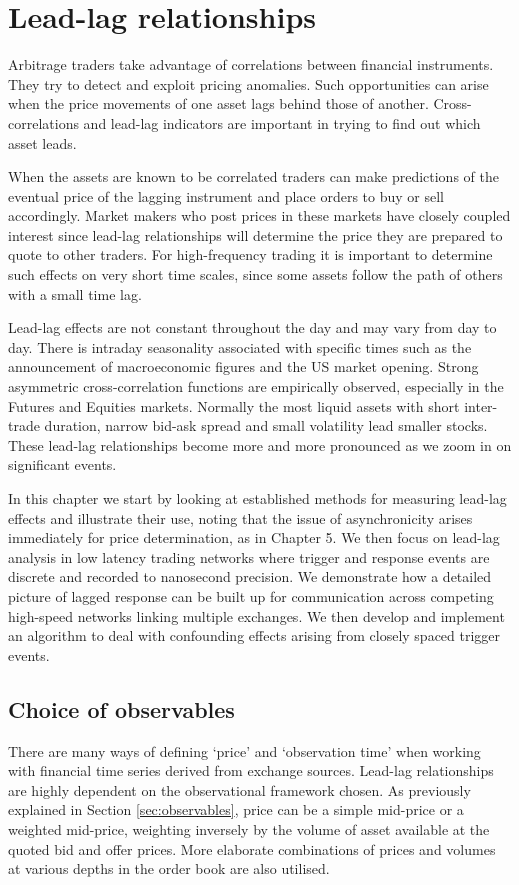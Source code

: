 \chapter{Lead-lag relationships} \label{chap:lagCorrelation}

Arbitrage traders take advantage of correlations between financial instruments. They try to detect and exploit pricing anomalies.  Such opportunities can arise when the price movements of one asset lags behind those of another. Cross-correlations and lead-lag indicators are important
in trying to find out which asset leads. 

When the assets are known to be correlated traders can make predictions of the eventual price of the lagging instrument and place orders to buy or sell accordingly.  Market makers who post prices in these markets have closely coupled interest since lead-lag relationships will determine the price they are prepared to quote to other traders. For high-frequency trading it is important to determine such effects on very short time scales, since some assets follow the
path of others with a small time lag.  

Lead-lag
effects are not constant throughout the day and may vary from day to day. There is intraday seasonality
associated with specific times such as the announcement of macroeconomic
figures and the US market opening. Strong asymmetric cross-correlation functions
are empirically observed, especially in the Futures and Equities markets. Normally the most
liquid assets with short inter-trade duration, narrow bid-ask spread and small volatility lead smaller stocks. These lead-lag relationships become more and more pronounced
as we zoom in on significant events.

In this chapter we start by looking at established methods for measuring lead-lag effects and illustrate their use, noting that the issue of asynchronicity arises immediately for price determination, as in Chapter 5.  We then focus on lead-lag analysis in low latency trading networks where trigger and response events are discrete and recorded to nanosecond precision. We demonstrate how a detailed picture of lagged response can be built up for communication across competing high-speed networks linking multiple exchanges. We then develop and implement an algorithm to deal with confounding effects arising from closely spaced trigger events.

\section{Choice of observables}
There are many ways of defining `price' and `observation time' when working with financial time series derived from exchange sources. Lead-lag relationships are highly dependent on the observational framework chosen.  As previously explained in Section \ref{sec:observables}, price can be a simple mid-price or a weighted mid-price, weighting inversely by the volume of asset available at the quoted bid and offer prices.  More elaborate combinations of prices and volumes at various depths in the order book are also utilised. 

